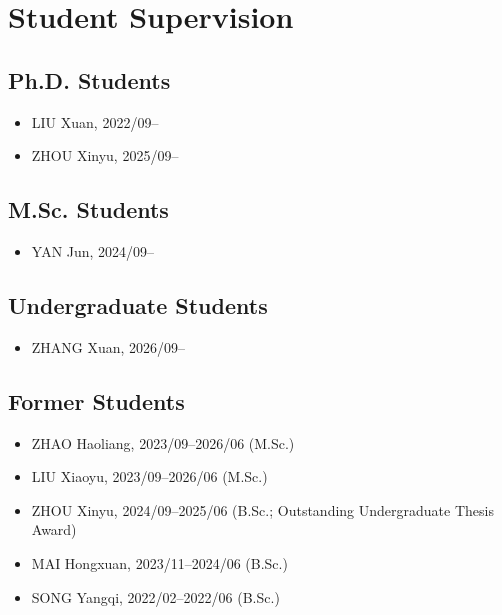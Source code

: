 \section{Student Supervision}

\subsection{Ph.D. Students}
\begin{itemize}
\item LIU Xuan, 2022/09--
\item ZHOU Xinyu, 2025/09--
\end{itemize}

\subsection{M.Sc. Students}
\begin{itemize}
\item YAN Jun, 2024/09--
\end{itemize}

\subsection{Undergraduate Students}
\begin{itemize}
\item ZHANG Xuan, 2026/09--
\end{itemize}

\subsection{Former Students}
\begin{itemize}
\item ZHAO Haoliang, 2023/09--2026/06 (M.Sc.)
\item LIU Xiaoyu, 2023/09--2026/06 (M.Sc.)
\item ZHOU Xinyu, 2024/09--2025/06 (B.Sc.; Outstanding Undergraduate Thesis Award)
\item MAI Hongxuan, 2023/11--2024/06 (B.Sc.)
\item SONG Yangqi, 2022/02--2022/06 (B.Sc.)
\end{itemize}
